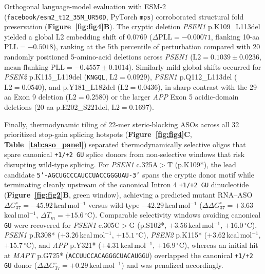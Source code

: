 \documentclass[11pt,a4paper]{article}
\begin{document}
Orthogonal language-model evaluation with ESM-2 (\texttt{facebook/esm2\_t12\_35M\_UR50D}, PyTorch \texttt{mps}) corroborated structural fold preservation (\textbf{Figure~\ref{fig:fig4}B}). The cryptic deletion \textit{PSEN1} p.K109\_L113del yielded a global L2 embedding shift of 0.0769 ($\Delta\mathrm{PLL}=-0.00071$, flanking 10-aa $\mathrm{PLL}=-0.5018$), ranking at the 5th percentile of perturbation compared with 20 randomly positioned 5-amino-acid deletions across \textit{PSEN1} ($\mathrm{L2}=0.1039 \pm 0.0236$, $\text{mean flanking PLL}=-0.4557 \pm 0.1014$). Similarly mild global shifts occurred for \textit{PSEN2} p.K115\_L119del (\texttt{KNGQL}, $\mathrm{L2}=0.0929$), \textit{PSEN1} p.Q112\_L113del ($\mathrm{L2}=0.0540$), and p.Y181\_L182del ($\mathrm{L2}=0.0436$), in sharp contrast with the 29-aa Exon 9 deletion ($\mathrm{L2}=0.2580$) or the larger \textit{APP} Exon 5 acidic-domain deletions (20 aa p.E202\_S221del, $\mathrm{L2}=0.1697$).

Finally, thermodynamic tiling of 22-mer steric-blocking ASOs across all 32 prioritized stop-gain splicing hotspots (\textbf{Figure~\ref{fig:fig4}C}, \textbf{Table~\ref{tab:aso_panel}}) separated thermodynamically selective oligos that spare canonical \texttt{+1/+2\,GU} splice donors from non-selective windows that risk disrupting wild-type splicing. For \textit{PSEN1} c.325A$>$T (p.K109*), the lead candidate \texttt{5'-AGCUGCCCAUCCUACCGGGUAU-3'} spans the cryptic donor motif while terminating cleanly upstream of the canonical Intron 4 \texttt{+1/+2\,GU} dinucleotide (\textbf{Figure~\ref{fig:fig2}B}, green window), achieving a predicted mutant RNA--ASO $\Delta G^\circ_{37}=-45.92$\,kcal\,mol$^{-1}$ versus wild-type $-42.29$\,kcal\,mol$^{-1}$ ($\Delta\Delta G^\circ_{37}=+3.63$\,kcal\,mol$^{-1}$, $\Delta T_m=+15.6\,^\circ$C). Comparable selectivity windows avoiding canonical \texttt{GU} were recovered for \textit{PSEN1} c.305C$>$G (p.S102*, $+3.56$\,kcal\,mol$^{-1}$, $+16.0\,^\circ$C), \textit{PSEN1} p.R308* ($+3.26$\,kcal\,mol$^{-1}$, $+15.1\,^\circ$C), \textit{PSEN2} p.K115* ($+3.62$\,kcal\,mol$^{-1}$, $+15.7\,^\circ$C), and \textit{APP} p.Y321* ($+4.31$\,kcal\,mol$^{-1}$, $+16.9\,^\circ$C), whereas an initial hit at \textit{MAPT} p.G725* (\texttt{ACCUUCCACAGGGCUACAUGGU}) overlapped the canonical \texttt{+1/+2\,GU} donor ($\Delta\Delta G^\circ_{37}=+0.29$\,kcal\,mol$^{-1}$) and was penalized accordingly.
\end{document}
